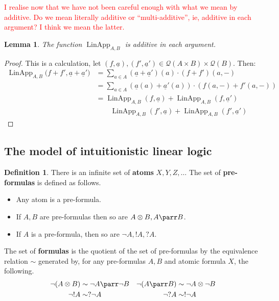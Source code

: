 \documentclass[12pt]{article}
\theoremstyle{plain}
\newtheorem{lemma}[thm]{Lemma}
\theoremstyle{definition}
\newtheorem{defn}[thm]{Definition} %
\newcommand{\call}[1]{\mathcal{#1}}
\begin{document}
\textcolor{red}{I realise now that we have not been careful enough with what we mean by additive. Do we mean literally additive or ``multi-additive'', ie, additive in each argument? I think we mean the latter.}

\begin{lemma}
The function $\operatorname{LinApp}_{A,B}$ is additive in each argument.
\end{lemma}
\begin{proof}
This is a calculation, let $(f, \underline{a}), (f', \underline{a}') \in \call{Q}(A \times B) \times \call{Q}(B)$. Then:
\begin{align*}
	\operatorname{LinApp}_{A,B}\big(f + f', \underline{a} + \underline{a}'\big) &= \sum_{a \in A}(\underline{a} + \underline{a}')(a)\cdot (f + f')(a, -)\\
	&= \sum_{a \in A}(\underline{a}(a) + \underline{a}'(a))\cdot (f(a, -) + f'(a, -))\\
	&= \operatorname{LinApp}_{A,B}(f, \underline{a}) + \operatorname{LinApp}_{A,B}(f, \underline{a}')\\
	&\qquad \operatorname{LinApp}_{A,B}(f', \underline{a}) + \operatorname{LinApp}_{A,B}(f', \underline{a}')
\end{align*}
\end{proof}

\subsection{The model of intuitionistic linear logic}

	\begin{defn}
		There is an infinite set of \textbf{atoms} $X, Y, Z, \ldots$ The set of \textbf{pre-formulas} is defined as follows.
		\begin{itemize}
			\item Any atom is a pre-formula.
			\item If $A,B$ are pre-formulas then so are $A \otimes B, A \parr B$.
			\item If $A$ is a pre-formula, then so are $\neg A, ! A, ?A$.
			\end{itemize}
		The set of \textbf{formulas} is the quotient of the set of pre-formulas by the equivalence relation $\sim$ generated by, for any pre-formulas $A,B$ and atomic formula $X$, the following.
		\begin{align*}
			\neg(A \otimes B) &\sim \neg A \parr \neg B & \neg(A \parr B) &\sim \neg A \otimes \neg B\\
			\neg !A &\sim ? \neg A & \neg ? A &\sim ! \neg A
			\end{align*}
		\end{defn}
	
\end{document}
